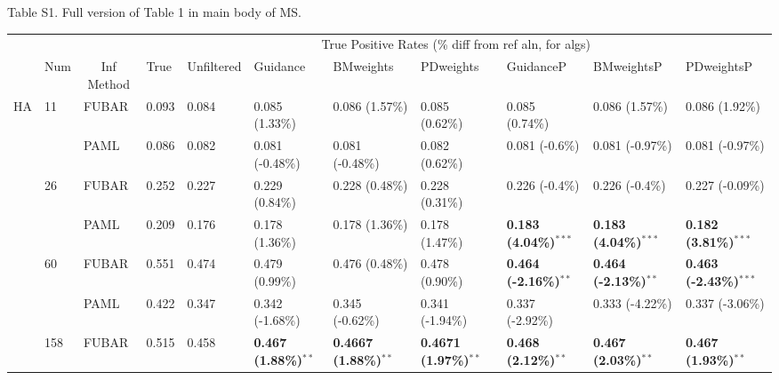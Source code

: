 \documentclass[11pt]{article}
\begin{document}
\noindent Table S1. Full version of Table 1 in main body of MS.
\begin{sidewaystable}[htbp]
\begin{adjustwidth}{-2.25cm}{}
\begin{tabular}{l l l l l l l l l l l}
\hline\noalign{\smallskip}
& & & \multicolumn{8}{c}{True Positive Rates (\% diff from ref aln, for algs)} \\
\cline{4-11}\noalign{\smallskip}
\multicolumn{1}{c}{Profile} & \multicolumn{1}{c}{Num} & \multicolumn{1}{c}{Inf Method} & \multicolumn{1}{l}{True} & \multicolumn{1}{l}{Unfiltered} & \multicolumn{1}{l}{Guidance} & \multicolumn{1}{l}{BMweights} & \multicolumn{1}{l}{PDweights} & \multicolumn{1}{l}{GuidanceP} & \multicolumn{1}{l}{BMweightsP} & \multicolumn{1}{l}{PDweightsP} \\
\noalign{\smallskip}\hline\noalign{\smallskip}
HA  &  11  &  FUBAR  &  0.093  &  0.084  &  0.085 (1.33\%)  &  0.086 (1.57\%)  &  0.085 (0.62\%)  &  0.085 (0.74\%)  &  0.086 (1.57\%)  &  0.086 (1.92\%)  \\
  &    &  PAML       &  0.086  &  0.082  &  0.081 (-0.48\%)  &  0.081 (-0.48\%)  &  0.082 (0.62\%)  &  0.081 (-0.6\%)  &  0.081 (-0.97\%)  &  0.081 (-0.97\%)  \\
\hline
  &  26  &  FUBAR    &  0.252  &  0.227  &  0.229 (0.84\%)  &  0.228 (0.48\%)  &  0.228 (0.31\%)  &  0.226 (-0.4\%)  &  0.226 (-0.4\%)  &  0.227 (-0.09\%)  \\
  &    &  PAML       &  0.209  &  0.176  &  0.178 (1.36\%)  & 0.178 (1.36\%)  &  0.178 (1.47\%)  &  \textbf{0.183 (4.04\%)}$^{\ast\ast\ast}$  &  \textbf{0.183 (4.04\%)}$^{\ast\ast\ast}$  &  \textbf{0.182 (3.81\%)}$^{\ast\ast\ast}$  \\
\hline
  &  60  &  FUBAR    &  0.551  &  0.474  &  0.479 (0.99\%)  &  0.476 (0.48\%)  &  0.478 (0.90\%)  &  \textbf{0.464 (-2.16\%)}$^{\ast\ast}$  &  \textbf{0.464 (-2.13\%)}$^{\ast\ast}$  &  \textbf{0.463 (-2.43\%)}$^{\ast\ast\ast}$  \\
  &    &  PAML       &  0.422  &  0.347  &  0.342 (-1.68\%)  &  0.345 (-0.62\%)  &  0.341 (-1.94\%)  &  0.337 (-2.92\%)  &  0.333 (-4.22\%)  &  0.337 (-3.06\%)  \\
\hline
  &  158  &  FUBAR   &  0.515  &  0.458  & \textbf{0.467 (1.88\%)}$^{\ast\ast}$  &  \textbf{0.4667 (1.88\%)}$^{\ast\ast}$  &  \textbf{0.4671 (1.97\%)}$^{\ast\ast}$  &  \textbf{0.468 (2.12\%)}$^{\ast\ast}$  &  \textbf{0.467 (2.03\%)}$^{\ast\ast}$  &  \textbf{0.467 (1.93\%)}$^{\ast\ast}$  \\
\hline

\end{tabular}
\end{adjustwidth}
\end{sidewaystable}
\end{document}
